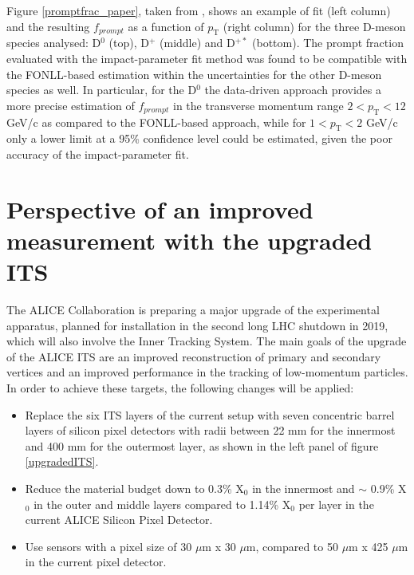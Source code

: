 \documentclass[b5paper,10pt,twoside,oldstyle,classica]{toptesi}
\newcommand{\pt}{p_\text{T}}
\begin{document}
Figure \ref{promptfrac_paper}, taken from \cite{Adam:2016ich}, shows an example of fit (left column) and the resulting $f_{prompt}$ as a function of $\pt$ (right column) for the three D-meson species analysed: D$^0$ (top), D$^+$ (middle) and D$^{+*}$ (bottom). The prompt fraction evaluated with the impact-parameter fit method was found to be compatible with the FONLL-based estimation within the uncertainties for the other D-meson species as well. In particular, for the D$^0$ the data-driven approach provides a more precise estimation of $f_{prompt}$ in the transverse momentum range $ 2<\pt<12$ GeV/c as compared to the FONLL-based approach, while for $1<\pt<2$ GeV/c only a lower limit at a 95\% confidence level could be estimated, given the poor accuracy of the impact-parameter fit.  
\section{Perspective of an improved measurement with the upgraded ITS}
The ALICE Collaboration is preparing a major upgrade of the experimental apparatus, planned for installation in the second long LHC shutdown in 2019, which will also involve the Inner Tracking System. The main goals of the upgrade of the ALICE ITS are an improved reconstruction of primary and secondary vertices and an improved performance in the tracking of low-momentum particles. In order to achieve these targets, the following changes will be applied:
\begin{itemize}
  \item Replace the six ITS layers of the current setup with seven concentric barrel layers of silicon pixel detectors with radii between 22 mm for the innermost and 400 mm for the outermost layer, as shown in the left panel of figure \ref{upgradedITS}.
  \item Reduce the material budget down to 0.3\% X$_0$ in the innermost and $\sim$ 0.9\% X$_0$ in the outer and middle layers compared to 1.14\% X$_0$ per layer in the current ALICE Silicon Pixel Detector.
  \item Use sensors with a pixel size of 30 $\mu$m x 30 $\mu$m, compared to 50 $\mu$m x 425 $\mu$m in the current pixel detector.
\end{itemize}
\end{document}
